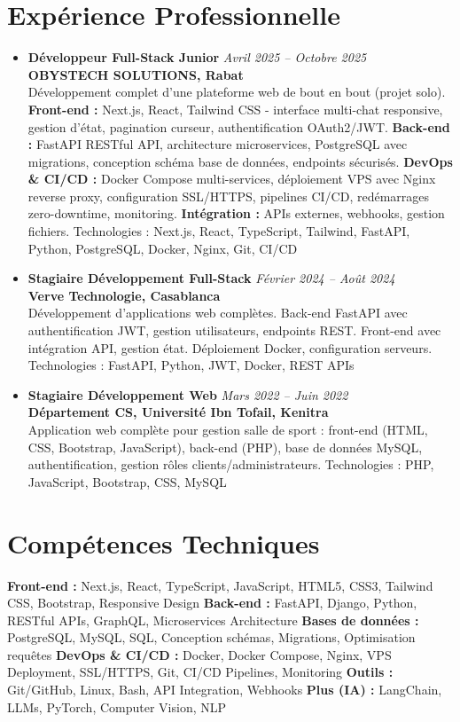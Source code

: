 \documentclass[10pt,a4paper]{article}
\newcommand{\cvitem}[2]{\textbf{#1} \hfill \textit{#2}}
\begin{document}
\section*{Expérience Professionnelle}
\begin{itemize}
    \item \cvitem{Développeur Full-Stack Junior}{Avril 2025 -- Octobre 2025}\\
    \textbf{OBYSTECH SOLUTIONS, Rabat}\\
    Développement complet d'une plateforme web de bout en bout (projet solo). \textbf{Front-end :} Next.js, React, Tailwind CSS - interface multi-chat responsive, gestion d'état, pagination curseur, authentification OAuth2/JWT. \textbf{Back-end :} FastAPI RESTful API, architecture microservices, PostgreSQL avec migrations, conception schéma base de données, endpoints sécurisés. \textbf{DevOps \& CI/CD :} Docker Compose multi-services, déploiement VPS avec Nginx reverse proxy, configuration SSL/HTTPS, pipelines CI/CD, redémarrages zero-downtime, monitoring. \textbf{Intégration :} APIs externes, webhooks, gestion fichiers. Technologies : Next.js, React, TypeScript, Tailwind, FastAPI, Python, PostgreSQL, Docker, Nginx, Git, CI/CD
    \item \cvitem{Stagiaire Développement Full-Stack}{Février 2024 -- Août 2024}\\
    \textbf{Verve Technologie, Casablanca}\\
    Développement d'applications web complètes. Back-end FastAPI avec authentification JWT, gestion utilisateurs, endpoints REST. Front-end avec intégration API, gestion état. Déploiement Docker, configuration serveurs. Technologies : FastAPI, Python, JWT, Docker, REST APIs
    \item \cvitem{Stagiaire Développement Web}{Mars 2022 -- Juin 2022}\\
    \textbf{Département CS, Université Ibn Tofail, Kenitra}\\
    Application web complète pour gestion salle de sport : front-end (HTML, CSS, Bootstrap, JavaScript), back-end (PHP), base de données MySQL, authentification, gestion rôles clients/administrateurs. Technologies : PHP, JavaScript, Bootstrap, CSS, MySQL
\end{itemize}

\section*{Compétences Techniques}
\textbf{Front-end :} Next.js, React, TypeScript, JavaScript, HTML5, CSS3, Tailwind CSS, Bootstrap, Responsive Design \quad
\textbf{Back-end :} FastAPI, Django, Python, RESTful APIs, GraphQL, Microservices Architecture \quad
\textbf{Bases de données :} PostgreSQL, MySQL, SQL, Conception schémas, Migrations, Optimisation requêtes \quad
\textbf{DevOps \& CI/CD :} Docker, Docker Compose, Nginx, VPS Deployment, SSL/HTTPS, Git, CI/CD Pipelines, Monitoring \quad
\textbf{Outils :} Git/GitHub, Linux, Bash, API Integration, Webhooks \quad
\textbf{Plus (IA) :} LangChain, LLMs, PyTorch, Computer Vision, NLP
\end{document}
